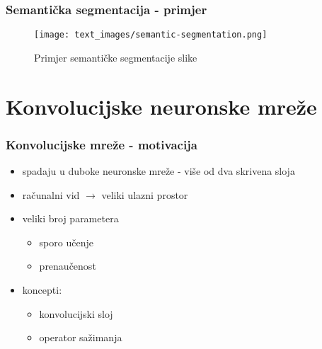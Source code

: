 \documentclass[utf8]{beamer}
\begin{document}

\begin{frame}
\frametitle{Semantička segmentacija - primjer}

\begin{figure}[htb]
  \centering
  \texttt{[image: text\_images/semantic-segmentation.png]}
  \caption{Primjer semantičke segmentacije slike}
\end{figure}

\end{frame}

\section{Konvolucijske neuronske mreže}

\begin{frame}
\frametitle{Konvolucijske mreže - motivacija}

\begin{itemize}
\item spadaju u duboke neuronske mreže - više od dva skrivena sloja
\item računalni vid $\rightarrow$ veliki ulazni prostor
\item veliki broj parametera
  \begin{itemize}
    \item sporo učenje
    \item prenaučenost
  \end{itemize}
\item koncepti:
  \begin{itemize}
    \item konvolucijski sloj
    \item operator sažimanja
  \end{itemize}
\end{itemize}

\end{frame}

\end{document}
